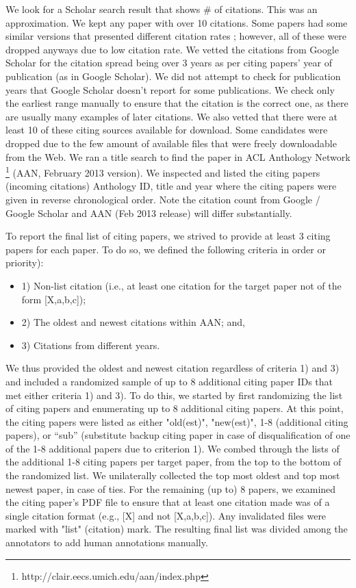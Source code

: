 \documentclass[11pt]{article}
\begin{document}
We look for a Scholar search result that shows \# of citations. This was an 
approximation. We kept any paper with over 10 citations. Some papers had 
some similar versions that presented different citation rates ; however, 
all of these were dropped anyways due to low citation rate.
We vetted the citations from Google Scholar for the citation spread being 
over 3 years as per citing papers' year of publication (as in Google Scholar). 
We did not attempt to check for publication years that Google Scholar doesn't 
report for some publications. We check only the earliest range manually to 
ensure that the citation is the correct one, as there are usually many examples 
of later citations. We also vetted that there were at least 10 of these citing 
sources available for download. Some candidates were dropped due to the few 
amount of available files that were freely downloadable from the Web.
We ran a title search to find the paper in ACL Anthology Network  
\footnote{http://clair.eecs.umich.edu/aan/index.php}
(AAN, February 2013 version). We inspected and listed the citing papers 
(incoming citations) Anthology ID, title and year where the citing papers 
were given in reverse chronological order. Note the citation count from 
Google / Google Scholar and AAN (Feb 2013 release) will differ substantially.

To report the final list of citing papers, we strived to provide at least 
3 citing papers for each paper. To do so, we defined the following criteria 
in order or priority): 
\begin{itemize}
\item 1) Non-list citation (i.e., at least one citation for the
target paper not of the form [X,a,b,c]); 
\item 2) The oldest and newest
citations within AAN; and, 
\item 3) Citations from different years. 
\end{itemize} 

We thus provided the oldest and newest citation regardless of criteria 
1) and 3) and included a randomized sample of up to 8 additional citing 
paper IDs that met either criteria 1) and 3). To do this, we started by 
first randomizing the list of citing papers and enumerating up to 8 
additional citing papers. At this point, the citing papers were listed 
as either "old(est)", "new(est)", 1-8 (additional citing papers),  or ``sub''
(substitute backup citing paper in case of disqualification of 
one of the 1-8 additional papers due to criterion 1). We combed through the 
lists of the additional 1-8 citing papers per target paper, from the top to 
the bottom of the randomized list.  We unilaterally collected the top most 
oldest and top most newest paper, in case of ties.  For the remaining (up to) 
8 papers, we examined the citing paper's PDF file to ensure that at least one 
citation made was of a single citation format (e.g., [X] and not [X,a,b,c]). 
Any invalidated files were marked with "list" (citation) mark. The resulting 
final list was divided among the annotators to add human annotations manually.
\end{document}
